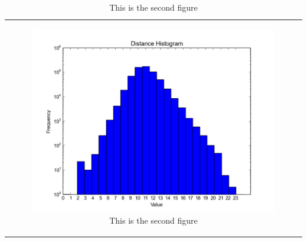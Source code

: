 \begin{table}[t]
\begin{tabular}{@{}c@{}}
\begin{minipage}{0.4\linewidth}
  \end{minipage}
  \hspace{0.05\linewidth}
  \begin{minipage}{0.45\linewidth}
      \begin{figure}[H]
          \includegraphics[scale=0.425]{../figures/distance.pdf}
          \caption{This is the second figure}
      \end{figure}
  \end{minipage}
  \end{tabular}
\end{table}


